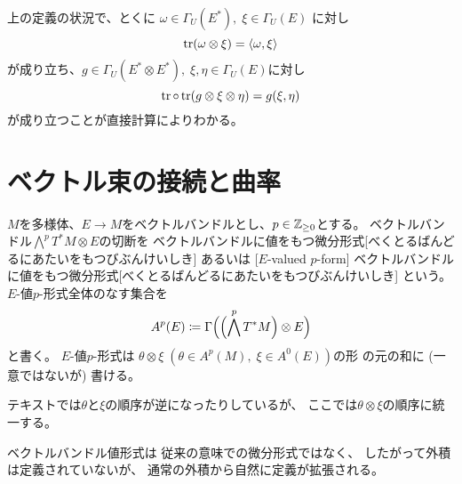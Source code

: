 \documentclass[report]{jlreq}
\begin{document}
\begin{remark}
    上の定義の状況で、とくに
    $\omega \in \Gamma_U(E^*), \; \xi \in \Gamma_U(E)$
    に対し
    \begin{equation}
        \operatorname{tr} (\omega \otimes \xi) = \langle \omega, \xi \rangle
    \end{equation}
    が成り立ち、$g \in \Gamma_U(E^* \otimes E^*), \; \xi, \eta \in \Gamma_U(E)$に対し
    \begin{equation}
        \operatorname{tr} \circ \operatorname{tr} (g \otimes \xi \otimes \eta) = g(\xi, \eta)
    \end{equation}
    が成り立つことが直接計算によりわかる。
\end{remark}

%
\section{ベクトル束の接続と曲率}

\begin{definition}[ベクトルバンドルに値をもつ微分形式]
    $M$を多様体、$E \to M$をベクトルバンドルとし、$p \in \mathbb{Z}_{\ge 0}$とする。
    ベクトルバンドル$\bigwedge^p T^*M \otimes E$の切断を
    {ベクトルバンドルに値をもつ微分形式}[べくとるばんどるにあたいをもつびぶんけいしき]
    あるいは
    [$E$-valued $p$-form]
    {ベクトルバンドルに値をもつ微分形式}[べくとるばんどるにあたいをもつびぶんけいしき]
    という。
    $E$-値$p$-形式全体のなす集合を
    \begin{equation}
        A^p(E) \coloneqq \Gamma\Bigl(
            \Bigl(\bigwedge^p T^*M\Bigr) \otimes E
        \Bigr)
    \end{equation}
    と書く。
    $E$-値$p$-形式は
    $\theta \otimes \xi \; (\theta \in A^p(M), \; \xi \in A^0(E))$の形
    の元の和に (一意ではないが) 書ける。
\end{definition}

\begin{remark}
    テキストでは$\theta$と$\xi$の順序が逆になったりしているが、
    ここでは$\theta \otimes \xi$の順序に統一する。
\end{remark}

ベクトルバンドル値形式は
従来の意味での微分形式ではなく、
したがって外積は定義されていないが、
通常の外積から自然に定義が拡張される。
\end{document}
